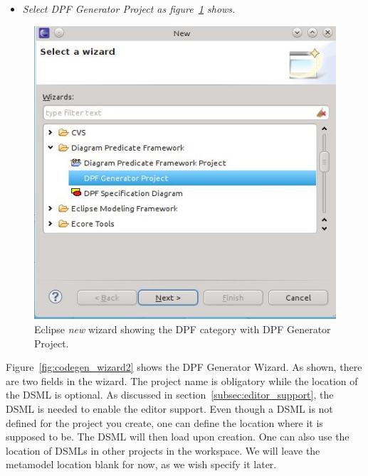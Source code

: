 \begin{itemize}
  \item \emph{Select DPF Generator Project as figure~\ref{fig:codegen_wizard1} shows.}
\end{itemize}

\begin{figure}[h]
  \centering
  \centerline{\includegraphics[scale=0.53]{images/codegen_wizard1.jpeg}}
  \caption[Eclipse wizard]{Eclipse \emph{new} wizard showing the DPF category with DPF Generator Project.}
  \label{fig:codegen_wizard1}
\end{figure}

Figure~\ref{fig:codegen_wizard2} shows the DPF Generator Wizard. As shown, there are two fields in the wizard. The project name is obligatory while the location of the DSML is optional. As discussed in section~\ref{subsec:editor_support}, the DSML is needed to enable the editor support. Even though a DSML is not defined for the project you create, one can define the location where it is supposed to be. The DSML will then load upon creation. One can also use the location of DSMLs in other projects in the workspace. We will leave the metamodel location blank for now, as we wish specify it later.

